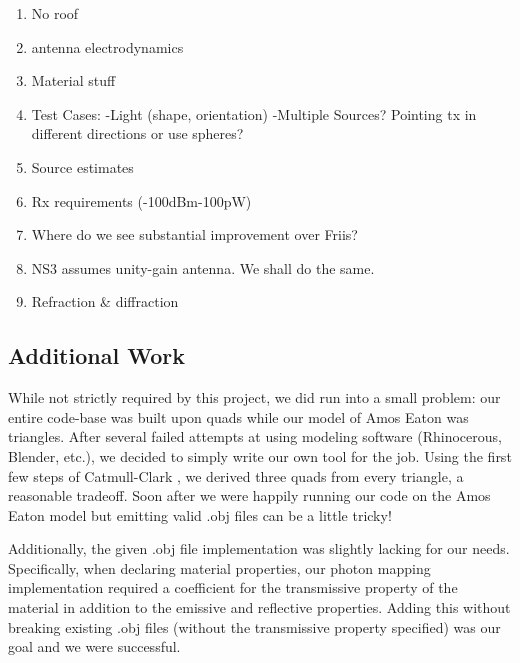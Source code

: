 \documentclass[%
        final,
        notitlepage,
        narroweqnarray,
        inline,
        twoside,
        ]{ieee}
\begin{document}
\begin{enumerate}

\item No roof

\item antenna electrodynamics

\item Material stuff

\item Test Cases:
-Light (shape, orientation)\newline
-Multiple Sources? Pointing tx in different directions or use spheres?

\item Source estimates

\item Rx requirements (-100dBm-100pW)

\item Where do we see substantial improvement over Friis?

\item NS3 assumes unity-gain antenna.  We shall do the same.

\item Refraction \& diffraction

\end{enumerate}

\subsection{Additional Work}
While not strictly required by this project, we did run into a small problem:
our entire code-base was built upon quads while our model of Amos Eaton was
triangles.  After several failed attempts at using modeling software
(Rhinocerous, Blender, etc.), we decided to simply write our own tool for the
job.  Using the first few steps of Catmull-Clark \cite{Catmull1978350}, we
derived three quads from every triangle, a reasonable tradeoff.  Soon after we
were happily running our code on the Amos Eaton model but emitting valid .obj
files can be a little tricky!

Additionally, the given .obj file implementation was slightly lacking for our
needs.  Specifically, when declaring material properties, our photon mapping
implementation required a coefficient for the transmissive property of the
material in addition to the emissive and reflective properties.  Adding this
without breaking existing .obj files (without the transmissive property
specified) was our goal and we were successful.
\end{document}
